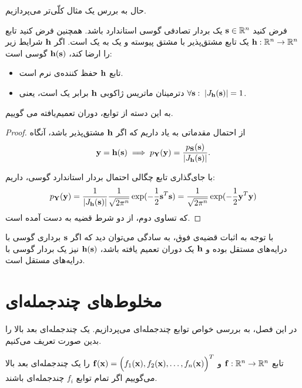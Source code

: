\documentclass[oneside]{thesis}
\begin{document}
حال به بررس یک مثال کلّی‌تر می‌پردازیم.
\begin{theorem}
فرض کنید 
$\mathbf{s} \in \mathbb{R}^n$
یک بردار تصادفی گوسی استاندارد باشد. همچنین فرض کنید تابع 
$\mathbf{h}: \mathbb{R}^n \to \mathbb{R}^n$
یک تابع مشتق‌پذیر با مشتق پیوسته و یک به یک است. اگر $\mathbf{h}$ شرایط زیر را ارضا کند،
$\mathbf{h}(\mathbf{s})$
گوسی است:
\begin{itemize}
\item 
تابع 
$\mathbf{h}$
حفظ ‌کننده‌ی نرم است.

\item 
دترمینان ماتریس ژاکوبی $\mathbf{h}$ برابر یک است، یعنی
$\forall \mathbf{s}: \; |J_{\mathbf{h}}(\mathbf{s})| = 1$.
\end{itemize}

به این دسته از توابع، دوران‌ تعمیم‌یافته می گوییم.
\end{theorem}

\begin{proof}
از احتمال مقدماتی به یاد داریم که اگر 
$\mathbf{h}$
مشتق‌پذیر باشد، آنگاه
\begin{equation}
\mathbf{y} = \mathbf{h}(\mathbf{s}) \implies p_{\mathbf{Y}}(\mathbf{y}) = \frac{p_{\mathbf{S}}(\mathbf{s})}{|J_{\mathbf{h}}(\mathbf{s})|}.
\end{equation}

با جای‌گذاری تابع چگالی احتمال بردار استاندارد گوسی، داریم:
\begin{equation}
p_{\mathbf{Y}}(\mathbf{y}) = \frac{1}{|J_{\mathbf{h}}(\mathbf{s})|}\frac{1}{\sqrt{2\pi^n}}\exp(-\frac{1}{2} \mathbf{s}^T\mathbf{s}) = \frac{1}{\sqrt{2\pi^n}} \exp(-\frac{1}{2} \mathbf{y}^T \mathbf{y}) 
\end{equation}
که تساوی دوم، از دو شرط قضیه به دست آمده است.

\end{proof}

\begin{remark}
با توجه به اثبات قضیه‌ی فوق، به سادگی می‌توان دید که اگر 
$\mathbf{s}$
برداری گوسی با درایه‌های مستقل بوده و
$\mathbf{h}$
یک دوران تعمیم یافته باشد،
$\mathbf{h}(\mathbf{s})$
 نیز یک بردار گوسی با درایه‌های مستقل است.
\end{remark}
\section{مخلوط‌های چندجمله‌ای}

در این فصل، به بررسی خواص توابع چندجمله‌ای می‌پردازیم. یک چند‌جمله‌ای بعد بالا را بدین صورت تعریف می‌کنیم.
\begin{definition}
تابع 
$\mathbf{f}: \mathbb{R}^n \to \mathbb{R}^n$
و 
$\mathbf{f}(\mathbf{x}) = \Big(f_1(\mathbf{x}), f_2(\mathbf{x}), \dots, f_n(\mathbf{x})\Big)^T$
را یک چندجمله‌ای بعد بالا می‌گوییم اگر تمام توابع 
$f_i$
چندجمله‌ای باشند.
\end{definition}
\end{document}
